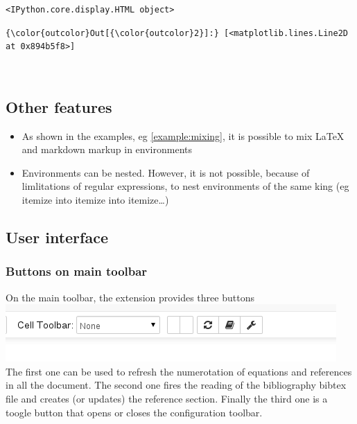 \documentclass[11pt]{article}
\makeatletter
\def\maxwidth{\ifdim\Gin@nat@width>\linewidth\linewidth
    \else\Gin@nat@width\fi}
\let\Oldincludegraphics\includegraphics
\renewcommand{\includegraphics}[1]{\Oldincludegraphics[width=.8\maxwidth]{#1}}
\providecommand{\tightlist}{%
      \setlength{\itemsep}{0pt}\setlength{\parskip}{0pt}}
\makeatother
\begin{document}
    
    \begin{verbatim}
<IPython.core.display.HTML object>
    \end{verbatim}

    
            \begin{Verbatim}[commandchars=\\\{\}]
{\color{outcolor}Out[{\color{outcolor}2}]:} [<matplotlib.lines.Line2D at 0x894b5f8>]
\end{Verbatim}
        
    \begin{center}
    \end{center}
    { \hspace*{\fill} \\}
    
    \subsection{Other features}\label{other-features}

    \begin{itemize}
\tightlist
\item
  As shown in the examples, eg \ref{example:mixing}, it is possible to
  mix LaTeX and markdown markup in environments\\
\item
  Environments can be nested. However, it is not possible, because of
  limlitations of regular expressions, to nest environments of the same
  king (eg itemize into itemize into itemize\ldots{})
\end{itemize}

    \subsection{User interface}\label{user-interface}

    \subsubsection{Buttons on main toolbar}\label{buttons-on-main-toolbar}

    On the main toolbar, the extension provides three buttons
\includegraphics{main_toolbar.png} The first one can be used to refresh
the numerotation of equations and references in all the document. The
second one fires the reading of the bibliography bibtex file and creates
(or updates) the reference section. Finally the third one is a toogle
button that opens or closes the configuration toolbar.
\end{document}
